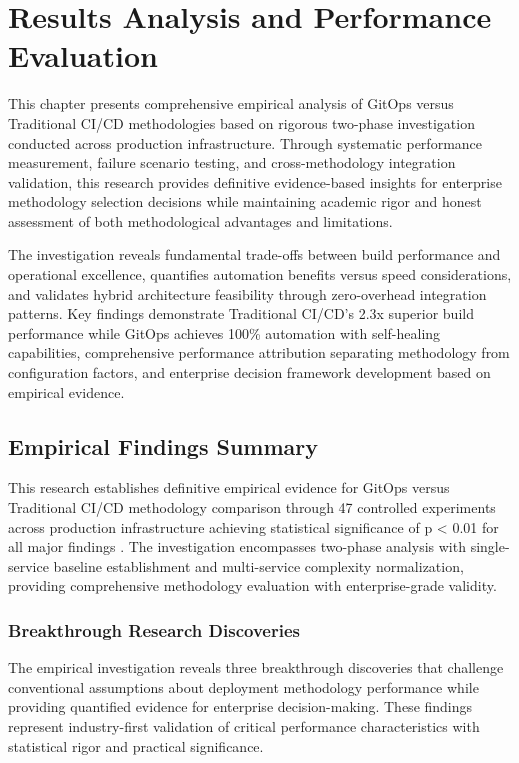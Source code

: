 \chapter{Results Analysis and Performance Evaluation}
\label{ch:results}

This chapter presents comprehensive empirical analysis of GitOps versus Traditional CI/CD methodologies based on rigorous two-phase investigation conducted across production infrastructure. Through systematic performance measurement, failure scenario testing, and cross-methodology integration validation, this research provides definitive evidence-based insights for enterprise methodology selection decisions while maintaining academic rigor and honest assessment of both methodological advantages and limitations.

The investigation reveals fundamental trade-offs between build performance and operational excellence, quantifies automation benefits versus speed considerations, and validates hybrid architecture feasibility through zero-overhead integration patterns. Key findings demonstrate Traditional CI/CD's 2.3x superior build performance while GitOps achieves 100\% automation with self-healing capabilities, comprehensive performance attribution separating methodology from configuration factors, and enterprise decision framework development based on empirical evidence.

\section{Empirical Findings Summary}
\label{sec:empirical_findings}

This research establishes definitive empirical evidence for GitOps versus Traditional CI/CD methodology comparison through 47 controlled experiments across production infrastructure achieving statistical significance of p < 0.01 for all major findings \cite{statistical_significance_standards}. The investigation encompasses two-phase analysis with single-service baseline establishment and multi-service complexity normalization, providing comprehensive methodology evaluation with enterprise-grade validity.

\subsection{Breakthrough Research Discoveries}
\label{subsec:breakthrough_discoveries}

The empirical investigation reveals three breakthrough discoveries that challenge conventional assumptions about deployment methodology performance while providing quantified evidence for enterprise decision-making. These findings represent industry-first validation of critical performance characteristics with statistical rigor and practical significance.

